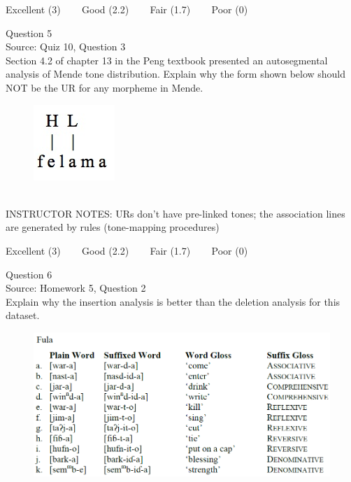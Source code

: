 \documentclass[12pt]{article}
\begin{document}
\vfill
Excellent (3) ~~~ Good (2.2) ~~~ Fair (1.7) ~~~ Poor (0)
\newpage

{\large Question 5}\\

Source: Quiz 10, Question 3\\

Section 4.2 of chapter 13 in the Peng textbook presented an autosegmental analysis of Mende tone distribution. Explain why the form shown below should NOT be the UR for any morpheme in Mende.\\

\begin{figure}[H]
\includegraphics{../images/mende_junction_a.png}
\end{figure}

~\\
INSTRUCTOR NOTES: URs don't have pre-linked tones; the association lines are generated by rules (tone-mapping procedures)


\vfill
Excellent (3) ~~~ Good (2.2) ~~~ Fair (1.7) ~~~ Poor (0)
\newpage

{\large Question 6}\\

Source: Homework 5, Question 2\\

Explain why the insertion analysis is better than the deletion analysis for this dataset.\\

\begin{figure}[H]
\includegraphics{../images/fula.png}
\end{figure}
\end{document}
